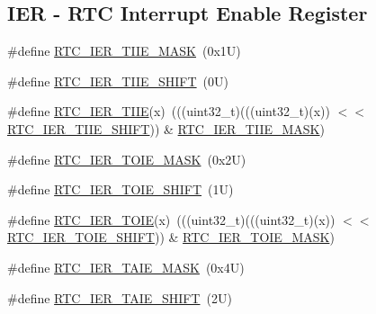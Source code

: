 \subsection*{I\+ER -\/ R\+TC Interrupt Enable Register}
\begin{DoxyCompactItemize}
\item 
\#define \mbox{\hyperlink{group___r_t_c___register___masks_ga4401cd4dce34a638f75403a2a3701e6d}{R\+T\+C\+\_\+\+I\+E\+R\+\_\+\+T\+I\+I\+E\+\_\+\+M\+A\+SK}}~(0x1\+U)
\item 
\#define \mbox{\hyperlink{group___r_t_c___register___masks_ga2938c56e7566549f7434b8f02ad6d478}{R\+T\+C\+\_\+\+I\+E\+R\+\_\+\+T\+I\+I\+E\+\_\+\+S\+H\+I\+FT}}~(0\+U)
\item 
\#define \mbox{\hyperlink{group___r_t_c___register___masks_gabfbef54705a0c0320ffac94154df5628}{R\+T\+C\+\_\+\+I\+E\+R\+\_\+\+T\+I\+IE}}(x)~(((uint32\+\_\+t)(((uint32\+\_\+t)(x)) $<$$<$ \mbox{\hyperlink{group___r_t_c___register___masks_ga2938c56e7566549f7434b8f02ad6d478}{R\+T\+C\+\_\+\+I\+E\+R\+\_\+\+T\+I\+I\+E\+\_\+\+S\+H\+I\+FT}})) \& \mbox{\hyperlink{group___r_t_c___register___masks_ga4401cd4dce34a638f75403a2a3701e6d}{R\+T\+C\+\_\+\+I\+E\+R\+\_\+\+T\+I\+I\+E\+\_\+\+M\+A\+SK}})
\item 
\#define \mbox{\hyperlink{group___r_t_c___register___masks_ga1dfc25308bec00f67925ae796f805d3d}{R\+T\+C\+\_\+\+I\+E\+R\+\_\+\+T\+O\+I\+E\+\_\+\+M\+A\+SK}}~(0x2\+U)
\item 
\#define \mbox{\hyperlink{group___r_t_c___register___masks_gaf9355764ec83dde6e2890f391a469856}{R\+T\+C\+\_\+\+I\+E\+R\+\_\+\+T\+O\+I\+E\+\_\+\+S\+H\+I\+FT}}~(1\+U)
\item 
\#define \mbox{\hyperlink{group___r_t_c___register___masks_ga32cf27d2d16f386987e4299177578929}{R\+T\+C\+\_\+\+I\+E\+R\+\_\+\+T\+O\+IE}}(x)~(((uint32\+\_\+t)(((uint32\+\_\+t)(x)) $<$$<$ \mbox{\hyperlink{group___r_t_c___register___masks_gaf9355764ec83dde6e2890f391a469856}{R\+T\+C\+\_\+\+I\+E\+R\+\_\+\+T\+O\+I\+E\+\_\+\+S\+H\+I\+FT}})) \& \mbox{\hyperlink{group___r_t_c___register___masks_ga1dfc25308bec00f67925ae796f805d3d}{R\+T\+C\+\_\+\+I\+E\+R\+\_\+\+T\+O\+I\+E\+\_\+\+M\+A\+SK}})
\item 
\#define \mbox{\hyperlink{group___r_t_c___register___masks_gad1bcc4df9a637ec5ab4b611391986c06}{R\+T\+C\+\_\+\+I\+E\+R\+\_\+\+T\+A\+I\+E\+\_\+\+M\+A\+SK}}~(0x4\+U)
\item 
\#define \mbox{\hyperlink{group___r_t_c___register___masks_gae15cd7098592da4c3a2c2563879ae5d8}{R\+T\+C\+\_\+\+I\+E\+R\+\_\+\+T\+A\+I\+E\+\_\+\+S\+H\+I\+FT}}~(2\+U)

\end{DoxyCompactItemize}

